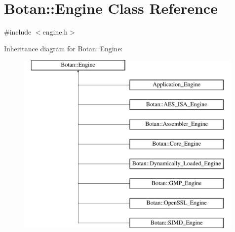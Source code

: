 \hypertarget{classBotan_1_1Engine}{\section{Botan\-:\-:Engine Class Reference}
\label{classBotan_1_1Engine}
}


{\ttfamily \#include $<$engine.\-h$>$}

Inheritance diagram for Botan\-:\-:Engine\-:\begin{figure}[H]
\begin{center}
\leavevmode
\includegraphics[height=9.000000cm]{classBotan_1_1Engine}
\end{center}
\end{figure}
